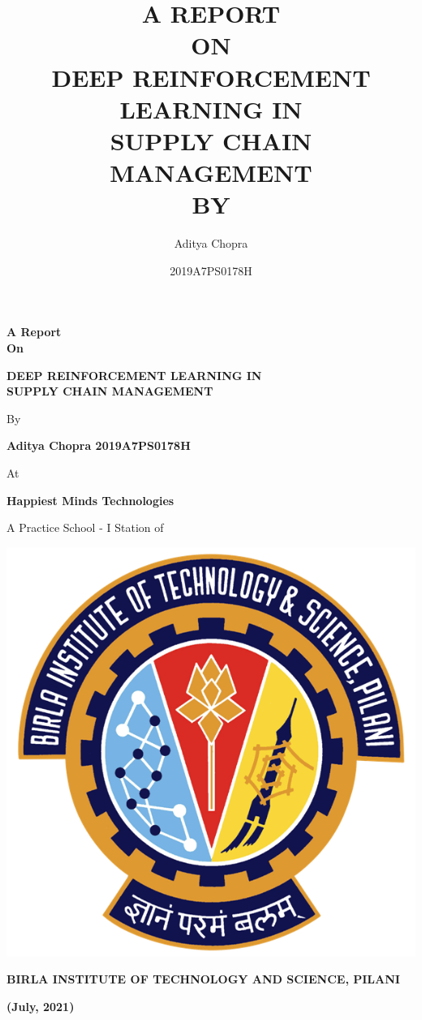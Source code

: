\documentclass{article}
\title{A REPORT \\ ON \\ \textbf{DEEP REINFORCEMENT LEARNING IN \\ SUPPLY CHAIN MANAGEMENT} \\ \large{BY}}
\author{{Aditya Chopra} \and {2019A7PS0178H}}
\begin{document}
\begin{titlepage}
    \begin{center}
        \vspace*{1cm}

        \large\textbf{A Report \\ On}

        \vspace{0.5cm}

        \LARGE\textbf{DEEP REINFORCEMENT LEARNING IN \\ SUPPLY CHAIN MANAGEMENT}

        \vspace{0.5cm}

        \large By

        \vspace{1.5cm}

        \textbf{Aditya Chopra \hfill 2019A7PS0178H}

        \vspace{1.5cm}

        \large At

        \vspace{0.5cm}
        \textbf{Happiest Minds Technologies}

        \vspace{0.5cm}
        A Practice School - I Station of

        \vspace{0.8cm}
        \includegraphics{bits_logo.png}
        \vspace{0.8cm}

        \Large
        \textbf{BIRLA INSTITUTE OF TECHNOLOGY AND SCIENCE, PILANI}

        \textbf{(July, 2021)}

    \end{center}

\end{titlepage}
\end{document}
